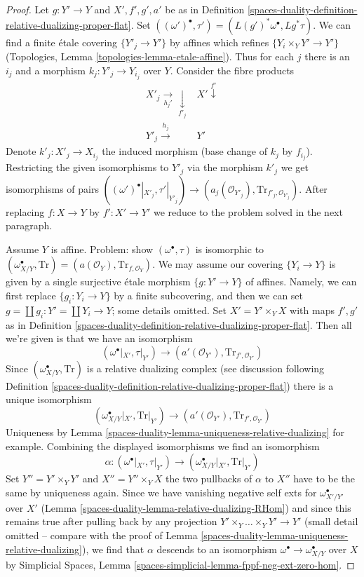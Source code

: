 \begin{proof}
Let $g : Y' \to Y$ and $X', f', g', a'$ be as in
Definition \ref{spaces-duality-definition-relative-dualizing-proper-flat}.
Set $((\omega')^\bullet, \tau') = (L(g')^*\omega^\bullet, Lg^*\tau)$.
We can find a finite \'etale covering
$\{Y'_j \to Y'\}$ by affines which refines $\{Y_i \times_Y Y' \to Y'\}$
(Topologies, Lemma \ref{topologies-lemma-etale-affine}).
Thus for each $j$ there is an $i_j$ and a morphism
$k_j : Y'_j \to Y_{i_j}$ over $Y$. Consider the fibre products
$$
\begin{array}{cc}X'_j \underset{h_j'}{\longrightarrow}\underset{f'_j}{\downarrow} & X' \overset{f'}{\downarrow} \\ Y'_j \overset{h_j}{\longrightarrow} & Y'\end{array}
$$
Denote $k'_j : X'_j \to X_{i_j}$ the induced morphism (base change
of $k_j$ by $f_{i_j}$). Restricting the given isomorphisms to $Y'_j$
via the morphism $k'_j$ we get isomorphisms of pairs
$((\omega')^\bullet|_{X'_j}, \tau'|_{Y'_j})
\to (a_j(\mathcal{O}_{Y'_j}), \text{Tr}_{f'_j, \mathcal{O}_{Y'_j}})$.
After replacing $f : X \to Y$ by $f' : X' \to Y'$ we reduce to the
problem solved in the next paragraph.

\medskip\noindent
Assume $Y$ is affine. Problem: show $(\omega^\bullet, \tau)$ is
isomorphic to $(\omega_{X/Y}^\bullet, \text{Tr}) =
(a(\mathcal{O}_Y), \text{Tr}_{f, \mathcal{O}_Y})$.
We may assume our covering $\{Y_i \to Y\}$ is given by a single
surjective \'etale morphism $\{g : Y' \to Y\}$ of affines.
Namely, we can first replace $\{g_i: Y_i \to Y\}$ by a finite
subcovering, and then we can set $g = \coprod g_i :  Y' = \coprod Y_i \to Y$;
some details omitted. Set $X' = Y' \times_Y X$ with maps
$f', g'$ as in Definition \ref{spaces-duality-definition-relative-dualizing-proper-flat}.
Then all we're given is that we have an isomorphism
$$
(\omega^\bullet|_{X'}, \tau|_{Y'}) \to
(a'(\mathcal{O}_{Y'}), \text{Tr}_{f', \mathcal{O}_{Y'}})
$$
Since $(\omega_{X/Y}^\bullet, \text{Tr})$ is a relative dualizing complex
(see discussion following
Definition \ref{spaces-duality-definition-relative-dualizing-proper-flat})
there is a unique isomorphism
$$
(\omega_{X/Y}^\bullet|_{X'}, \text{Tr}|_{Y'}) \to
(a'(\mathcal{O}_{Y'}), \text{Tr}_{f', \mathcal{O}_{Y'}})
$$
Uniqueness by Lemma \ref{spaces-duality-lemma-uniqueness-relative-dualizing} for example.
Combining the displayed isomorphisms we find an isomorphism
$$
\alpha :
(\omega^\bullet|_{X'}, \tau|_{Y'}) \to
(\omega_{X/Y}^\bullet|_{X'}, \text{Tr}|_{Y'})
$$
Set $Y'' = Y' \times_Y Y'$ and $X'' = Y'' \times_Y X$ the two
pullbacks of $\alpha$ to $X''$ have to be the same by uniqueness again.
Since we have vanishing negative self exts for
$\omega_{X'/Y'}^\bullet$ over $X'$ (Lemma \ref{spaces-duality-lemma-relative-dualizing-RHom})
and since this remains true after pulling back by any projection
$Y' \times_Y \ldots \times_Y Y' \to Y'$ (small detail omitted -- compare
with the proof of Lemma \ref{spaces-duality-lemma-uniqueness-relative-dualizing}),
we find that $\alpha$ descends to an isomorphism
$\omega^\bullet \to \omega_{X/Y}^\bullet$
over $X$ by Simplicial Spaces, Lemma
\ref{spaces-simplicial-lemma-fppf-neg-ext-zero-hom}.
\end{proof}

